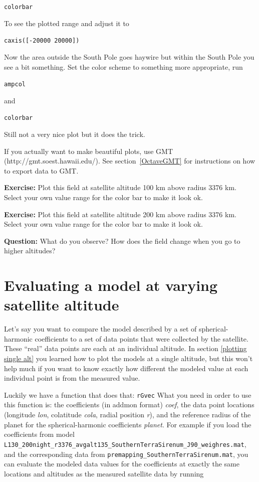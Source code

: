\documentclass[11pt]{article}
\begin{document}
\qquad\verb+colorbar+

To see the plotted range and adjust it to

\qquad\verb+caxis([-20000 20000])+

Now the area outside the South Pole goes haywire but within the South Pole you see a bit something. Set the color scheme to something more appropriate, run 

\qquad\verb+ampcol+

and 

\qquad\verb+colorbar+

Still not a very nice plot but it does the trick.

If you actually want to make beautiful plots, use GMT \\(http://gmt.soest.hawaii.edu/). See section~\ref{OctaveGMT} for instructions on how to export data to GMT.

\textbf{Exercise:} Plot this field at satellite altitude 100 km above radius 3376 km. Select your own value range for the color bar to make it look ok. 

\textbf{Exercise:} Plot this field at satellite altitude 200 km above radius 3376 km. Select your own value range for the color bar to make it look ok. 

\textbf{Question:} What do you observe? How does the field change when you go to higher altitudes?

\section{Evaluating a model at varying satellite altitude}


Let's say you want to compare the model described by a set of spherical-harmonic coefficients to a set of data points that were collected by the satellite. These ``real'' data points are each at an individual altitude. In section \ref{plotting single alt} you learned how to plot the models at a single altitude, but this won't help much if you want to know exactly how different the modeled value at each individual point is from the measured value. 

Luckily we have a function that does that: \verb+rGvec+ 
 What you need in order to use this function is: the coefficients (in addmon format) \emph{coef}, the data point locations (longitude \emph{lon}, colatitude \emph{cola}, radial position \emph{r}), and the reference radius of the planet for the spherical-harmonic coefficients \emph{planet}. For example if you load the coefficients from model\\
  \verb+L130_200night_r3376_avgalt135_SouthernTerraSirenum_J90_weighres.mat+,\\
and the corresponding data from \verb+premapping_SouthernTerraSirenum.mat+, you can evaluate the modeled data values for the coefficients at exactly the same locations and altitudes as the measured satellite data by running
\end{document}
